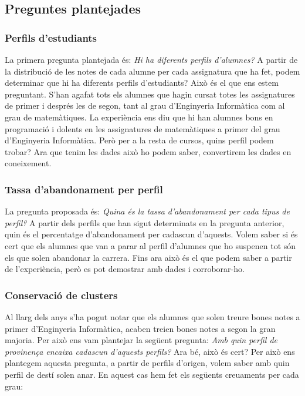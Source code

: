 \documentclass[12pt,a4paper,catalan]{article}
\begin{document}
\newpage

\subsection{Preguntes plantejades}
\subsubsection{Perfils d'estudiants}
La primera pregunta plantejada és: \textit{Hi ha diferents perfils d'alumnes?} A partir de la distribució de les notes de cada alumne per cada assignatura que ha fet, podem determinar que hi ha diferents perfils d'estudiants? Això és el que ens estem preguntant. S'han agafat tots els alumnes que hagin cursat totes les assignatures de primer i després les de segon, tant al grau d'Enginyeria Informàtica com al grau de matemàtiques. La experiència ens diu que hi han alumnes bons en programació i dolents en les assignatures de matemàtiques a primer del grau d'Enginyeria Informàtica. Però per a la resta de cursos, quins perfil podem trobar? Ara que tenim les dades això ho podem saber, convertirem les dades en coneixement.

\subsubsection{Tassa d'abandonament per perfil}
La pregunta proposada és: \textit{Quina és la tassa d'abandonament per cada tipus de perfil?} A partir dels perfils que han sigut determinats en la pregunta anterior, quin és el percentatge d'abandonament per cadascun d'aquests. Volem saber si és cert que els alumnes que van a parar al perfil d'alumnes que ho suspenen tot són els que solen abandonar la carrera. Fins ara això és el que podem saber a partir de l'experiència, però es pot demostrar amb dades i corroborar-ho.

\subsubsection{Conservació de clusters}
Al llarg dels anys s'ha pogut notar que els alumnes que solen treure bones notes a primer d'Enginyeria Informàtica, acaben treien bones notes a segon la gran majoria. Per això ens vam plantejar la següent pregunta: \textit{Amb quin perfil de provinença encaixa cadascun d'aquests perfils?} Ara bé, això és cert? Per això ens plantegem aquesta pregunta, a partir de perfils d'origen, volem saber amb quin perfil de destí solen anar. En aquest cas hem fet els següents creuaments per cada grau:
\end{document}
